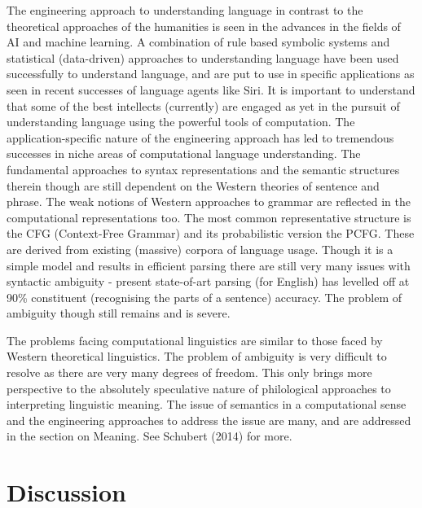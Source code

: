 The engineering approach to understanding language in contrast to the theoretical approaches of the humanities is seen in the advances in the fields of AI and machine learning. A combination of rule based symbolic systems and statistical (data-driven) approaches to understanding language have been used successfully to understand language, and are put to use in specific applications as seen in recent successes of language agents like Siri. It is important to understand that some of the best intellects (currently) are engaged as yet in the pursuit of understanding language using the powerful tools of computation. The application-specific nature of the engineering approach has led to tremendous successes in niche areas of computational language understanding. The fundamental approaches to syntax representations and the semantic structures therein though are still dependent on the Western theories of sentence and phrase. The weak notions of Western approaches to grammar are reflected in the computational representations too. The most common representative structure is the CFG (Context-Free Grammar) and its probabilistic version the PCFG. These are derived from existing (massive) corpora of language usage. Though it is a simple model and results in efficient parsing there are still very many issues with syntactic ambiguity - present state-of-art parsing (for English) has levelled off at 90\% constituent (recognising the parts of a sentence) accuracy. The problem of ambiguity though still remains and is severe.

The problems facing computational linguistics are similar to those faced by Western theoretical linguistics. The problem of ambiguity is very difficult to resolve as there are very many degrees of freedom. This only brings more perspective to the absolutely speculative nature of philological approaches to interpreting linguistic meaning. The issue of semantics in a computational sense and the engineering approaches to address the issue are many, and are addressed in the section on Meaning. See Schubert (2014) for more.


\section*{Discussion}

